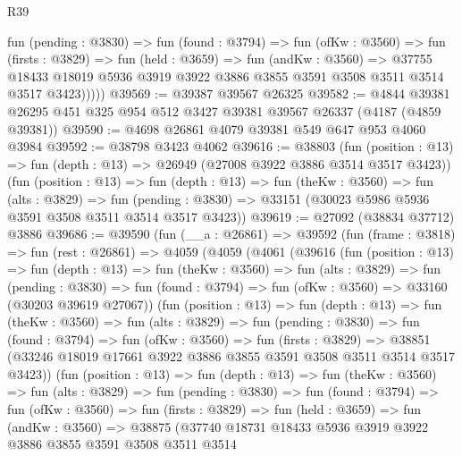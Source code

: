 \begin{lexlean}{R39}
\begin{coremodule}
            fun (pending : @3830) =>
            fun (found : @3794) =>
            fun (ofKw : @3560) =>
            fun (firsts : @3829) =>
            fun (held : @3659) =>
            fun (andKw : @3560) =>
            @37755
              @18433
              @18019
              @5936
              @3919
              @3922
              @3886
              @3855
              @3591
              @3508
              @3511
              @3514
              @3517
              @3423)))))
@39569 := @39387 @39567 @26325
@39582 := @4844 @39381 @26295 @451 @325 @954 @512 @3427 @39381 @39567 @26337 (@4187 (@4859 @39381))
@39590 := @4698 @26861 @4079 @39381 @549 @647 @953 @4060 @3984
@39592 := @38798 @3423 @4062
@39616 := @38803
    (fun (position : @13) => fun (depth : @13) => @26949 (@27008 @3922 @3886 @3514 @3517 @3423))
    (fun (position : @13) =>
    fun (depth : @13) =>
    fun (theKw : @3560) =>
    fun (alts : @3829) =>
    fun (pending : @3830) => @33151 (@30023 @5986 @5936 @3591 @3508 @3511 @3514 @3517 @3423))
@39619 := @27092 (@38834 @37712) @3886
@39686 := @39590
    (fun (__a : @26861) =>
    @39592
      (fun (frame : @3818) =>
      fun (rest : @26861) =>
      @4059
        (@4059
          (@4061
            (@39616
              (fun (position : @13) =>
              fun (depth : @13) =>
              fun (theKw : @3560) =>
              fun (alts : @3829) =>
              fun (pending : @3830) =>
              fun (found : @3794) => fun (ofKw : @3560) => @33160 (@30203 @39619 @27067))
              (fun (position : @13) =>
              fun (depth : @13) =>
              fun (theKw : @3560) =>
              fun (alts : @3829) =>
              fun (pending : @3830) =>
              fun (found : @3794) =>
              fun (ofKw : @3560) =>
              fun (firsts : @3829) =>
              @38851 (@33246 @18019 @17661 @3922 @3886 @3855 @3591 @3508 @3511 @3514 @3517 @3423))
              (fun (position : @13) =>
              fun (depth : @13) =>
              fun (theKw : @3560) =>
              fun (alts : @3829) =>
              fun (pending : @3830) =>
              fun (found : @3794) =>
              fun (ofKw : @3560) =>
              fun (firsts : @3829) =>
              fun (held : @3659) =>
              fun (andKw : @3560) =>
              @38875
                (@37740
                  @18731
                  @18433
                  @5936
                  @3919
                  @3922
                  @3886
                  @3855
                  @3591
                  @3508
                  @3511
                  @3514

\end{coremodule}
\end{lexlean}
